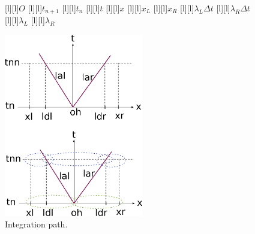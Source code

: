 \begin{figure}[ht]
	\centering
	\footnotesize

	[l]{$O$}
	[l]{$t_{n+1}$}
	[l]{$t_{n}$}
	[l]{$t$}
	[l]{$x$}
	[l]{$x_L$}
	[l]{$x_R$}
	[l]{$\lambda_{L}\Delta t$}
	[l]{$\lambda_{R}\Delta t$}
	[l]{$\lambda_L$}
	[l]{$\lambda_R$}

	\includegraphics[width=0.54\textwidth]{roeflux.eps}
	\caption{Integration path.}
	\label{\LABEL}
\end{figure}
